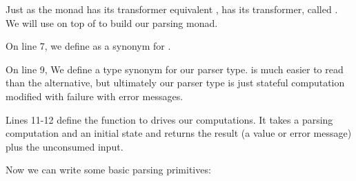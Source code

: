 Just as the  monad has its transformer equivalent ,  has its transformer,
called . We will use  on top of  to build our parsing monad.



\begin{notelist}
    \item On line 7, we define  as a synonym for .
    \item On line 9, We define a type synonym for our parser type.  is much easier to read
          than the alternative, but ultimately our parser type is just stateful computation modified with failure 
          with error messages.
    \item Lines 11-12 define the function to drives our  computations. It takes a parsing computation
          and an initial state and returns the result (a value or error message) plus the unconsumed input. 
\end{notelist}

Now we can write some basic parsing primitives:



